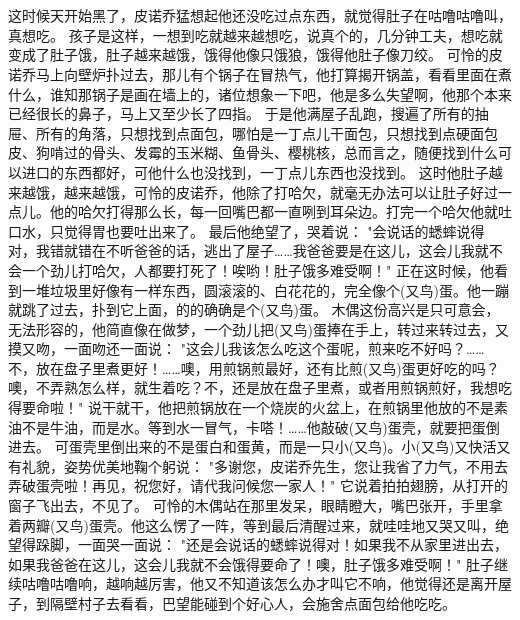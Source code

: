 \documentclass[12pt,UTF8]{ctexbook}
\begin{document}
\chapter{}

这时候天开始黑了，皮诺乔猛想起他还没吃过点东西，就觉得肚子在咕噜咕噜叫，真想吃。
孩子是这样，一想到吃就越来越想吃，说真个的，几分钟工夫，想吃就变成了肚子饿，肚子越来越饿，饿得他像只饿狼，饿得他肚子像刀绞。
可怜的皮诺乔马上向壁炉扑过去，那儿有个锅子在冒热气，他打算揭开锅盖，看看里面在煮什么，谁知那锅子是画在墙上的，诸位想象一下吧，他是多么失望啊，他那个本来已经很长的鼻子，马上又至少长了四指。
于是他满屋子乱跑，搜遍了所有的抽屉、所有的角落，只想找到点面包，哪怕是一丁点儿干面包，只想找到点硬面包皮、狗啃过的骨头、发霉的玉米糊、鱼骨头、樱桃核，总而言之，随便找到什么可以进口的东西都好，可他什么也没找到，一丁点儿东西也没找到。
这时他肚子越来越饿，越来越饿，可怜的皮诺乔，他除了打哈欠，就毫无办法可以让肚子好过一点儿。他的哈欠打得那么长，每一回嘴巴都一直咧到耳朵边。打完一个哈欠他就吐口水，只觉得胃也要吐出来了。
最后他绝望了，哭着说：
"会说话的蟋蟀说得对，我错就错在不听爸爸的话，逃出了屋子……我爸爸要是在这儿，这会儿我就不会一个劲儿打哈欠，人都要打死了！唉哟！肚子饿多难受啊！"
正在这时候，他看到一堆垃圾里好像有一样东西，圆滚滚的、白花花的，完全像个(又鸟)蛋。他一蹦就跳了过去，扑到它上面，的的确确是个(又鸟)蛋。
木偶这份高兴是只可意会，无法形容的，他简直像在做梦，一个劲儿把(又鸟)蛋捧在手上，转过来转过去，又摸又吻，一面吻还一面说：
"这会儿我该怎么吃这个蛋呢，煎来吃不好吗？……不，放在盘子里煮更好！……噢，用煎锅煎最好，还有比煎(又鸟)蛋更好吃的吗？噢，不弄熟怎么样，就生着吃？不，还是放在盘子里煮，或者用煎锅煎好，我想吃得要命啦！"
说干就干，他把煎锅放在一个烧炭的火盆上，在煎锅里他放的不是素油不是牛油，而是水。等到水一冒气，卡嗒！……他敲破(又鸟)蛋壳，就要把蛋倒进去。
可蛋壳里倒出来的不是蛋白和蛋黄，而是一只小(又鸟)。小(又鸟)又快活又有礼貌，姿势优美地鞠个躬说：
"多谢您，皮诺乔先生，您让我省了力气，不用去弄破蛋壳啦！再见，祝您好，请代我问候您一家人！"
它说着拍拍翅膀，从打开的窗子飞出去，不见了。
可怜的木偶站在那里发呆，眼睛瞪大，嘴巴张开，手里拿着两瓣(又鸟)蛋壳。他这么愣了一阵，等到最后清醒过来，就哇哇地又哭又叫，绝望得跺脚，一面哭一面说：
"还是会说话的蟋蟀说得对！如果我不从家里进出去，如果我爸爸在这儿，这会儿我就不会饿得要命了！噢，肚子饿多难受啊！"
肚子继续咕噜咕噜响，越响越厉害，他又不知道该怎么办才叫它不响，他觉得还是离开屋子，到隔壁村子去看看，巴望能碰到个好心人，会施舍点面包给他吃吃。

\chapter{}
\end{document}
